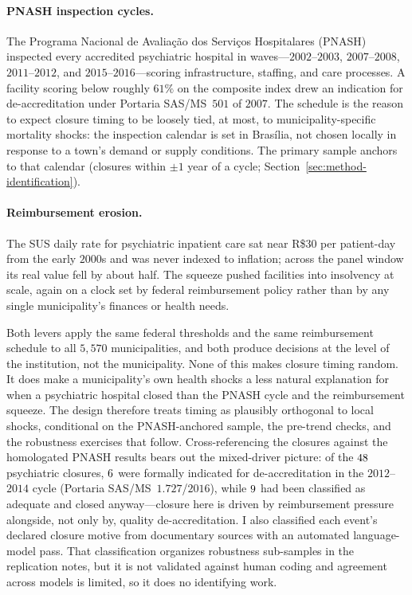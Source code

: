 \paragraph{PNASH inspection cycles.} The Programa Nacional de Avaliação
dos Serviços Hospitalares (PNASH) inspected every accredited psychiatric
hospital in waves---$2002$--$2003$, $2007$--$2008$, $2011$--$2012$, and
$2015$--$2016$---scoring infrastructure, staffing, and care processes. A
facility scoring below roughly $61\%$ on the composite index drew an
indication for de-accreditation under Portaria SAS/MS~$501$ of $2007$.
The schedule is the reason to expect closure timing to be loosely tied,
at most, to municipality-specific mortality shocks: the inspection
calendar is set in Brasília, not chosen locally in response to a town's
demand or supply conditions. The primary sample anchors to that calendar
(closures within $\pm 1$ year of a cycle;
Section~\ref{sec:method-identification}).

\paragraph{Reimbursement erosion.} The SUS daily rate for psychiatric
inpatient care sat near R\$$30$ per patient-day from the early $2000$s
and was never indexed to inflation; across the panel window its real
value fell by about half. The squeeze pushed facilities into insolvency
at scale, again on a clock set by federal reimbursement policy rather
than by any single municipality's finances or health needs.

Both levers apply the same federal thresholds and the same reimbursement
schedule to all $5{,}570$ municipalities, and both produce decisions at
the level of the institution, not the municipality. None of this makes
closure timing random. It does make a municipality's own health shocks a
less natural explanation for when a psychiatric hospital closed than the
PNASH cycle and the reimbursement squeeze. The design therefore treats
timing as plausibly orthogonal to local shocks, conditional on the
PNASH-anchored sample, the pre-trend checks, and the robustness exercises
that follow. Cross-referencing the closures against the homologated PNASH
results bears out the mixed-driver picture: of the $48$
psychiatric closures, $6$ were formally indicated for
de-accreditation in the $2012$--$2014$ cycle (Portaria SAS/MS~$1.727$/$2016$),
while $9$ had been classified as adequate and closed
anyway---closure here is driven by reimbursement pressure alongside, not
only by, quality de-accreditation. I also classified each event's declared
closure motive from documentary sources with an automated language-model
pass. That classification organizes robustness sub-samples in the
replication notes, but it is not validated against human coding and
agreement across models is limited, so it does no identifying work.

